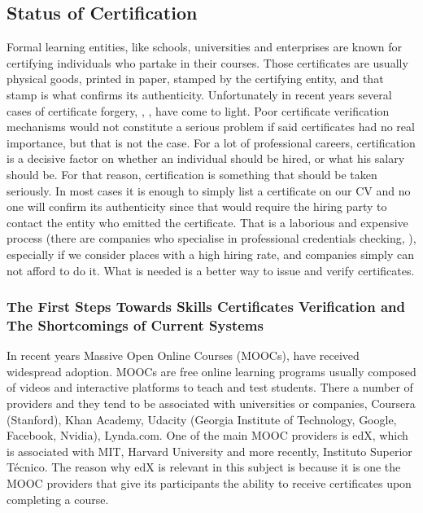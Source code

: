 \documentclass[llncsdoc]{llncs}
\begin{document}
\subsection{Status of Certification}
Formal learning entities, like schools, universities and enterprises are known for certifying individuals who partake in their courses. Those certificates are usually physical goods, printed in paper, stamped by the certifying entity, and that stamp is what confirms its authenticity. Unfortunately in recent years several cases of certificate forgery, \cite{SEWARD:2007wu}, \cite{HARRISON:2016uq}, have come to light. Poor certificate verification mechanisms would not constitute a serious problem if said certificates had no real importance, but that is not the case. For a lot of professional careers, certification is a decisive factor on whether an individual should be hired, or what his salary should be. For that reason, certification is something that should be taken seriously. In most cases it is enough to simply list a certificate on our CV and no one will confirm its authenticity since that would require the hiring party to contact the entity who emitted the certificate. That is a laborious and expensive process (there are companies who specialise in professional credentials checking, \cite{Equifax:vn}), especially if we consider places with a high hiring rate, and companies simply can not afford to do it. What is needed is a better way to issue and verify certificates.

\subsubsection{The First Steps Towards Skills Certificates Verification and The Shortcomings of Current Systems}

In recent years Massive Open Online Courses (MOOCs), \cite{Ch:2013ws} have received widespread adoption. MOOCs are free online learning programs usually composed of videos and interactive platforms to teach and test students. There a number of providers and they tend to be associated with universities or companies, Coursera (Stanford), Khan Academy, Udacity (Georgia Institute of Technology, Google, Facebook, Nvidia), Lynda.com. One of the main MOOC providers is edX, which is associated with MIT, Harvard University and more recently, Instituto Superior Técnico. The reason why edX is relevant in this subject is because it is one the MOOC providers that give its participants the ability to receive certificates upon completing a course.
\end{document}
